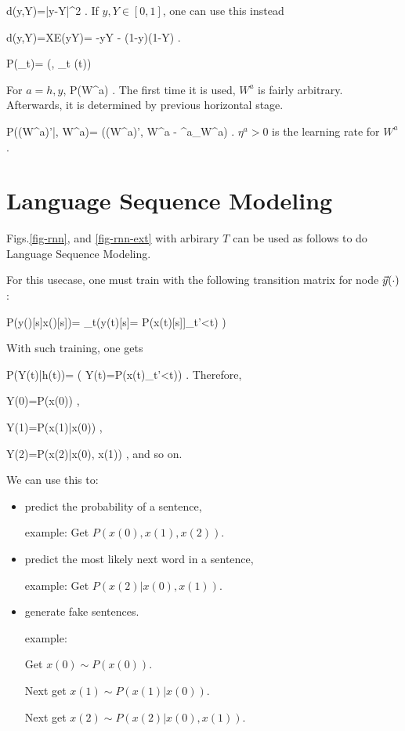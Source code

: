 \beq
d(y,Y)=|y-Y|^2
\;.
\label{eq-d-err-sq}
\eeq
If $y, Y\in [0,1]$, 
one can use this instead

\beq
d(y,Y)=XE(y\rarrow Y)=
-y\log Y - (1-y)\log (1-Y)
\;.
\eeq

\beq\color{blue}
P(\cale\cond [\cale(t)]_{\forall t})=
\delta(\cale, \sum_t \cale(t))
\eeq

For $a=h,y$,
\beq\color{blue}
P(W^a)
\;.
\eeq
The first time it is used,
$W^a$ is fairly arbitrary. Afterwards,
it is determined by previous 
horizontal
stage.

\beq\color{blue}
P((W^a)'|\cale, W^a)=
\delta((W^a)', W^a -
\eta ^a\partial_{W^a}\cale)
\;.
\eeq
$\eta ^a>0$ is the learning rate
for $W^a$.

\section*{Language Sequence Modeling}

Figs.\ref{fig-rnn}, and \ref{fig-rnn-ext}
with arbirary $T$ can be used 
as follows to do
Language Sequence Modeling.

For this usecase, one must
train with the following
transition matrix for node ${\vec{y}}(\cdot)$:

\beq\color{blue}
P(y(\cdot)[s]\cond x(\cdot)[s])=
\prod_t\indi(\;\;\;y(t)[s]=
P(x(t)[s]\cond [x(t')[s]]_{t'<t})
\;\;\;)
\eeq

With such training, one gets

\beq
P(Y(t)|h(t))=
\indi(\;\;\;
Y(t)=P(x(t)\cond [x(t')]_{t'<t})\;\;\;)
\;.
\eeq
Therefore,

\beq
Y(0)=P(x(0))
\;,
\eeq

\beq
Y(1)=P(x(1)|x(0))
\;,
\eeq

\beq
Y(2)=P(x(2)|x(0), x(1))
\;,
\eeq
and so on.

We can use this to: 
\begin{itemize}
\item
predict the probability 
of a sentence,

example: Get $P(x(0), x(1), x(2))$.
\item
predict 
the most likely 
next word in a sentence,

example: Get $P(x(2)| x(0), x(1))$.
\item generate fake sentences.

example: 

Get $x(0)\sim P(x(0))$.

Next get $x(1)\sim P(x(1)|x(0))$.

Next get $x(2)\sim P(x(2)|x(0), x(1))$.


\end{itemize}

